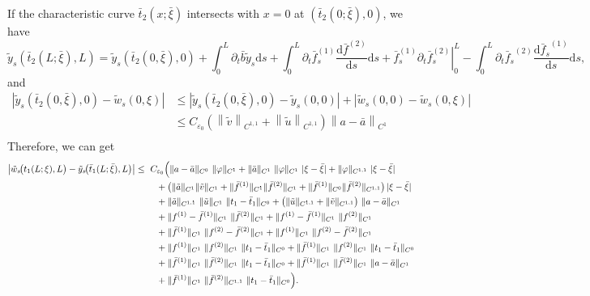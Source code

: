 \documentclass[a4paper,reqno,11pt]{amsart}
\numberwithin{equation}{section} %
\begin{document}
If the characteristic curve $\bar{t} _2(x;\bar{\xi}  )$ intersects with $x=0$ at $(\bar{t}_2(0;\bar{\xi} ),0)$, we have
$$
\tilde{y}_s\left( \bar{t}_2(L;\bar{\xi}),L \right) =\tilde{y}_s(\bar{t}_2(0,\bar{\xi}),0)+\int_0^L{\partial _t\bar{b}\tilde{y}_s\mathrm{d}s}+\int_0^L{\partial _t\bar{f}_{s}^{(1)}\frac{\mathrm{d}\bar{f}^{(2)}}{\mathrm{d}s}\mathrm{d}s}+\left. \bar{f}_{s}^{(1)}\partial _t\bar{f}_{s}^{(2)} \right|_{0}^{L}-\int_0^L{\partial _t{\bar{f}_s}^{(2)}\frac{\mathrm{d}{\bar{f}_s}^{(1)}}{\mathrm{d}s}\mathrm{d}s},
$$
and
$$
\begin{aligned}
	\left| \tilde{y}_s(\bar{t}_2(0,\bar{\xi}),0)-\tilde{w}_s(0,\xi ) \right|&\le \left| \tilde{y}_s(\bar{t}_2(0,\bar{\xi}),0)-\tilde{y}_s(0,0) \right|+\left| \tilde{w}_s(0,0)-\tilde{w}_s(0,\xi ) \right|\\
	&\le C_{\varepsilon _0}\left( \left\| \tilde{v} \right\| _{C^{1,1}}+\left\| \tilde{u} \right\| _{C^{1,1}} \right) \left\| a-\bar{a} \right\| _{C^1}\\
\end{aligned}
$$
Therefore, we can get
\[
\begin{aligned}
\bigl|\tilde w_s\!\bigl(t_1(L;\xi),L\bigr)-\tilde y_s\!\bigl(\bar t_1(L;\bar\xi),L\bigr)\bigr|
\le{}&\ C_{\varepsilon_0}\Bigl(
  \|a-\bar a\|_{C^{0}}\ \|\varphi\|_{C^{1}}
  + \|\bar a\|_{C^{1}}\ \|\varphi\|_{C^{1}}\ |\xi-\bar\xi|
  + \|\varphi\|_{C^{1,1}}\ |\xi-\bar\xi|
\\
&\quad
  + \bigl(\|\tilde a\|_{C^{1}}\|\tilde v\|_{C^{1}}
     + \|\bar f^{(1)}\|_{C^{1}}\|\bar f^{(2)}\|_{C^{1}}
     + \|\bar f^{(1)}\|_{C^{0}}\|\bar f^{(2)}\|_{C^{1,1}}\bigr)\,|\xi-\bar\xi|
\\
&\quad
  + \|\tilde a\|_{C^{1,1}}\ \|\tilde u\|_{C^{1}}\ \|t_1-\bar t_1\|_{C^{0}}
  + \bigl(\|\tilde u\|_{C^{1,1}}+\|\tilde v\|_{C^{1,1}}\bigr)\ \|a-\bar a\|_{C^{1}}
\\
&\quad
  + \|f^{(1)}-\bar f^{(1)}\|_{C^{1}}\ \|\bar f^{(2)}\|_{C^{1}}
  + \|f^{(1)}-\bar f^{(1)}\|_{C^{1}}\ \|f^{(2)}\|_{C^{1}}
\\
&\quad
  + \|\bar f^{(1)}\|_{C^{1}}\ \|f^{(2)}-\bar f^{(2)}\|_{C^{1}}
  + \|f^{(1)}\|_{C^{1}}\ \|f^{(2)}-\bar f^{(2)}\|_{C^{1}}
\\
&\quad
  + \|f^{(1)}\|_{C^{1}}\ \|f^{(2)}\|_{C^{1}}\ \|t_1-\bar t_1\|_{C^{0}}
  + \|\bar f^{(1)}\|_{C^{1}}\ \|f^{(2)}\|_{C^{1}}\ \|t_1-\bar t_1\|_{C^{0}}
\\
&\quad
  + \|\bar f^{(1)}\|_{C^{1}}\ \|\bar f^{(2)}\|_{C^{1}}\ \|t_1-\bar t_1\|_{C^{0}}
  + \|\bar f^{(1)}\|_{C^{1}}\ \|\bar f^{(2)}\|_{C^{1}}\ \|a-\bar a\|_{C^{1}}
\\
&\quad
  + \|\bar f^{(1)}\|_{C^{1}}\ \|\bar f^{(2)}\|_{C^{1,1}}\ \|t_1-\bar t_1\|_{C^{0}}
\Bigr).
\end{aligned}
\]
\end{document}
